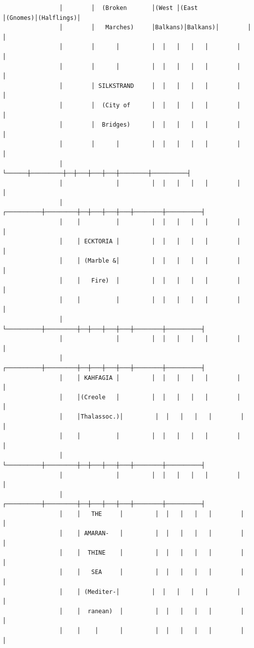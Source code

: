 \documentclass[12pt,oneside]{book}
\begin{document}
\begin{verbatim}
                │        │  (Broken       │(West │(East  │(Gnomes)│(Halflings)│
                │        │   Marches)     │Balkans)│Balkans)│        │          │
                │        │      │         │  │   │   │   │        │          │
                │        │      │         │  │   │   │   │        │          │
                │        │ SILKSTRAND     │  │   │   │   │        │          │
                │        │  (City of      │  │   │   │   │        │          │
                │        │  Bridges)      │  │   │   │   │        │          │
                │        │      │         │  │   │   │   │        │          │
                │        └──────┼─────────┼──┼───┼───┼───┼────────┼──────────┤
                │               │         │  │   │   │   │        │          │
                │    ┌──────────┼─────────┼──┼───┼───┼───┼────────┼──────────┤
                │    │          │         │  │   │   │   │        │          │
                │    │ ECKTORIA │         │  │   │   │   │        │          │
                │    │ (Marble &│         │  │   │   │   │        │          │
                │    │   Fire)  │         │  │   │   │   │        │          │
                │    │          │         │  │   │   │   │        │          │
                │    └──────────┼─────────┼──┼───┼───┼───┼────────┼──────────┤
                │               │         │  │   │   │   │        │          │
                │    ┌──────────┼─────────┼──┼───┼───┼───┼────────┼──────────┤
                │    │ KAHFAGIA │         │  │   │   │   │        │          │
                │    │(Creole   │         │  │   │   │   │        │          │
                │    │Thalassoc.)│         │  │   │   │   │        │          │
                │    │          │         │  │   │   │   │        │          │
                │    └──────────┼─────────┼──┼───┼───┼───┼────────┼──────────┤
                │               │         │  │   │   │   │        │          │
                │    ┌──────────┼─────────┼──┼───┼───┼───┼────────┼──────────┤
                │    │   THE     │         │  │   │   │   │        │          │
                │    │ AMARAN-   │         │  │   │   │   │        │          │
                │    │  THINE    │         │  │   │   │   │        │          │
                │    │   SEA     │         │  │   │   │   │        │          │
                │    │ (Mediter-│         │  │   │   │   │        │          │
                │    │  ranean)  │         │  │   │   │   │        │          │
                │    │    │      │         │  │   │   │   │        │          │

\end{verbatim}
\end{document}
